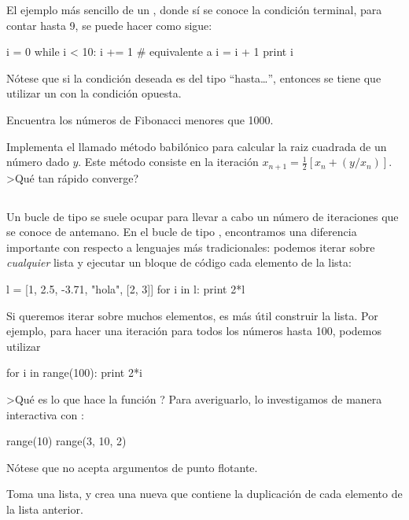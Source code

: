 El ejemplo más sencillo de un , donde sí se conoce la condición terminal, para contar hasta 9, se puede hacer como sigue:
\begin{python}
i = 0
while i < 10:
  i += 1	# equivalente a i = i + 1
  print i
\end{python}
Nótese que si la condición deseada es del tipo ``hasta\ldots'', entonces se tiene que utilizar un  con la condición opuesta. 

\ej Encuentra los números de Fibonacci menores que 1000.

\ej Implementa el llamado método babilónico para calcular la raiz cuadrada de un número dado $y$. Este método consiste en la iteración 
$x_{n+1} = \frac{1}{2} \left[x_n + (y / x_n) \right]$. >Qué tan rápido converge?



\subsection{}
Un bucle de tipo  se suele ocupar para llevar a cabo un número de iteraciones que se conoce de antemano.
En el bucle de tipo , encontramos una diferencia importante con respecto a lenguajes más tradicionales: podemos iterar sobre \emph{cualquier} lista y ejecutar un bloque de código  cada elemento de la lista:
\begin{python}
l = [1, 2.5, -3.71, "hola", [2, 3]]
for i in l:
  print 2*l
\end{python}

Si queremos iterar sobre muchos elementos, es más útil construir la lista. Por ejemplo, para hacer una iteración para todos los números hasta 100, podemos utilizar
\begin{python}
for i in range(100):
  print 2*i
\end{python}
>Qué es lo que hace la función ? Para averiguarlo, lo investigamos de manera interactiva con :
\begin{python}
range(10)
range(3, 10, 2)
\end{python}
Nótese que  no acepta argumentos de punto flotante.

\ej Toma una lista, y crea una nueva que contiene la duplicación de cada elemento de la lista anterior.


